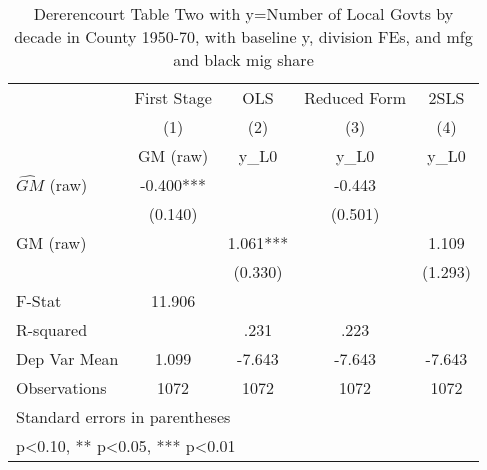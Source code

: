 \begin{table}[htbp]\centering
\def\sym#1{\ifmmode^{#1}\else\(^{#1}\)\fi}
\caption{Dererencourt Table Two with y=Number of Local Govts by decade in County 1950-70, with baseline y, division FEs, and mfg and black mig share}
\begin{tabular}{l*{4}{c}}
\toprule
                    & First Stage   &         OLS   &Reduced Form   &        2SLS   \\
                    &\multicolumn{1}{c}{(1)}&\multicolumn{1}{c}{(2)}&\multicolumn{1}{c}{(3)}&\multicolumn{1}{c}{(4)}\\
                    &\multicolumn{1}{c}{GM  (raw)}&\multicolumn{1}{c}{y\_L0}&\multicolumn{1}{c}{y\_L0}&\multicolumn{1}{c}{y\_L0}\\
\midrule
$\hat{GM}$ (raw)    &      -0.400***&               &      -0.443   &               \\
                    &     (0.140)   &               &     (0.501)   &               \\
\addlinespace
GM  (raw)           &               &       1.061***&               &       1.109   \\
                    &               &     (0.330)   &               &     (1.293)   \\
\midrule
F-Stat              &      11.906   &               &               &               \\
R-squared           &               &        .231   &        .223   &               \\
Dep Var Mean        &       1.099   &      -7.643   &      -7.643   &      -7.643   \\
Observations        &        1072   &        1072   &        1072   &        1072   \\
\bottomrule
\multicolumn{5}{l}{\footnotesize Standard errors in parentheses}\\
\multicolumn{5}{l}{\footnotesize * p<0.10, ** p<0.05, *** p<0.01}\\
\end{tabular}
\end{table}
